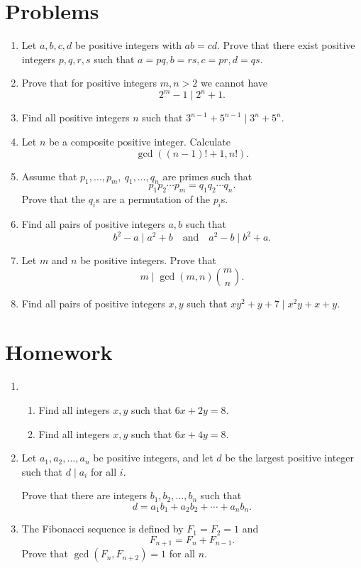 \documentclass{article}
\begin{document}
\section{Problems}
  \begin{enumerate}
    \item Let $a,b,c,d$ be positive integers with $ab=cd$. Prove that there
      exist positive integers $p,q,r,s$ such that \(a=pq,b=rs,c=pr,d=qs\).
    \item Prove that for positive integers $m,n>2$ we cannot have \[2^m-1\mid
        2^n+1.\]
    \item Find all positive integers $n$ such that $3^{n-1}+5^{n-1}\mid
      3^n+5^n$.
    \item Let $n$ be a composite positive integer. Calculate
      \[\gcd((n-1)!+1,n!).\]
    \item Assume that $p_1,\ldots,p_m,\ q_1,\ldots,q_n$ are primes such that
      \[p_1p_2\cdots p_m=q_1q_2\cdots q_n.\]
      Prove that the $q_i$s are a permutation of the $p_i$s.
    \item Find all pairs of positive integers $a,b$ such that \[b^2-a\mid
        a^2+b\quad\text{and}\quad a^2-b\mid b^2+a.\]
    \item Let $m$ and $n$ be positive integers. Prove that
      \[m\mid\gcd(m,n)\binom mn.\]
    \item Find all pairs of positive integers $x,y$ such that $xy^2+y+7\mid
      x^2y+x+y$.
  \end{enumerate}
\newpage
\section{Homework}
  \begin{enumerate}
    \item
      \begin{enumerate}
        \item Find all integers $x,y$ such that $6x+2y=8$.
        \item Find all integers $x,y$ such that $6x+4y=8$.
      \end{enumerate}
    \item Let $a_1,a_2,\ldots,a_n$ be positive integers, and let $d$ be the
      largest positive integer such that $d\mid a_i$ for all $i$.

      Prove that there are integers $b_1,b_2,\ldots,b_n$ such that
      \[d=a_1b_1+a_2b_2+\cdots+a_n b_n.\]
    \item The Fibonacci sequence is defined by $F_1=F_2=1$ and
      \[F_{n+1}=F_n+F_{n-1}.\]
      Prove that $\gcd(F_n,F_{n+2})=1$ for all $n$.
  \end{enumerate}
\end{document}
